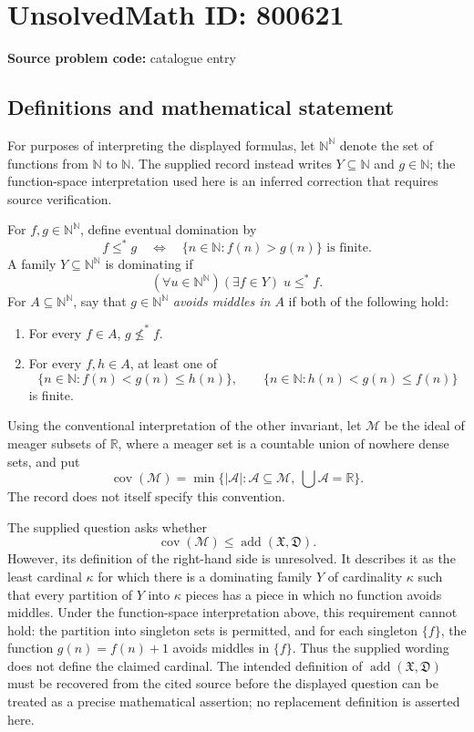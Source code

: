 \documentclass[11pt]{article}
\newcommand{\N}{\mathbb{N}}
\newcommand{\R}{\mathbb{R}}
\begin{document}
\section*{UnsolvedMath ID: 800621}
\textbf{Source problem code:} catalogue entry
\subsection{Definitions and mathematical statement}
For purposes of interpreting the displayed formulas, let \(\N^{\N}\) denote the set of functions from \(\N\) to \(\N\). The supplied record instead writes \(Y\subseteq\N\) and \(g\in\N\); the function-space interpretation used here is an inferred correction that requires source verification.

For \(f,g\in\N^{\N}\), define eventual domination by
\[
 f\leq^{*}g\quad\Longleftrightarrow\quad \{n\in\N:f(n)>g(n)\}\text{ is finite}.
\]
A family \(Y\subseteq\N^{\N}\) is dominating if
\[
 (\forall u\in\N^{\N})(\exists f\in Y)\;u\leq^{*}f.
\]
For \(A\subseteq\N^{\N}\), say that \(g\in\N^{\N}\) \emph{avoids middles in \(A\)} if both of the following hold:
\begin{enumerate}
\item For every \(f\in A\), \(g\not\leq^{*}f\).
\item For every \(f,h\in A\), at least one of
\[
 \{n\in\N:f(n)<g(n)\leq h(n)\},\qquad
 \{n\in\N:h(n)<g(n)\leq f(n)\}
\]
is finite.
\end{enumerate}
Using the conventional interpretation of the other invariant, let \(\mathcal M\) be the ideal of meager subsets of \(\R\), where a meager set is a countable union of nowhere dense sets, and put
\[
 \operatorname{cov}(\mathcal M)
 =\min\bigl\{|\mathcal A|:\mathcal A\subseteq\mathcal M,
                  \ \bigcup\mathcal A=\R\bigr\}.
\]
The record does not itself specify this convention.

The supplied question asks whether
\[
 \operatorname{cov}(\mathcal M)
 \leq \operatorname{add}(\mathfrak X,\mathfrak D).
\]
However, its definition of the right-hand side is unresolved. It describes it as the least cardinal \(\kappa\) for which there is a dominating family \(Y\) of cardinality \(\kappa\) such that every partition of \(Y\) into \(\kappa\) pieces has a piece in which no function avoids middles. Under the function-space interpretation above, this requirement cannot hold: the partition into singleton sets is permitted, and for each singleton \(\{f\}\), the function \(g(n)=f(n)+1\) avoids middles in \(\{f\}\). Thus the supplied wording does not define the claimed cardinal. The intended definition of \(\operatorname{add}(\mathfrak X,\mathfrak D)\) must be recovered from the cited source before the displayed question can be treated as a precise mathematical assertion; no replacement definition is asserted here.
\end{document}
